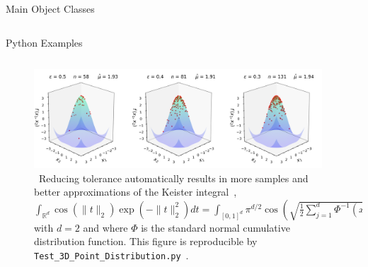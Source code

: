 \documentclass[final]{beamer}
\newlength{\onecolwid}
\newlength{\twocolwid}
\newlength{\threecolwid}
\newcommand{\dif}{\mathrm{d}}
\newcommand{\bvec}[1]{\boldsymbol{#1}}
\newcommand{\vx}{\bvec{x}}
\begin{document}
\begin{frame}[t]
\begin{columns}[t]
\begin{column}{\threecolwid}
\begin{columns}[t,totalwidth=\threecolwid]
\begin{column}{\twocolwid}
\begin{block}{Main Object Classes}
\end{block}
\end{column}

\end{columns} 

\begin{column}{\threecolwid}\vspace{-0.8in}
\begin{block}{Python Examples}
    \begin{column}{\twocolwid}
        \begin{figure} 
            \includegraphics[width=0.96\textwidth]{Images/Three_3d_SurfaceScatters.png}         
            \caption{\ Reducing tolerance automatically results in more samples and better approximations of the Keister integral~\cite{keister1996multidimensional},  
            $ \int_{\mathbb{R}^d} \cos(\lVert t \rVert_2) \exp(-\lVert t \rVert_2^2)dt =  \int_{[0,1]^d} \pi^{d/2} 
\cos\left(\sqrt{ \frac 12 \sum_{j=1}^d\Phi^{-1}(x_j)}\right)  \, \dif \vx \approx 1.80819 $  with $d=2$ and where $\Phi$ is the  standard normal  cumulative distribution function. This figure is reproducible by \texttt{Test\_3D\_Point\_Distribution.py}~\cite{HicEtal19}.}  \label{fig3d}
        \end{figure} 
    \end{column}
    \begin{column}{\onecolwid}
        
    \end{column}

\end{block}
\end{column}

\end{column}


\end{columns}
\end{frame}
\end{document}
